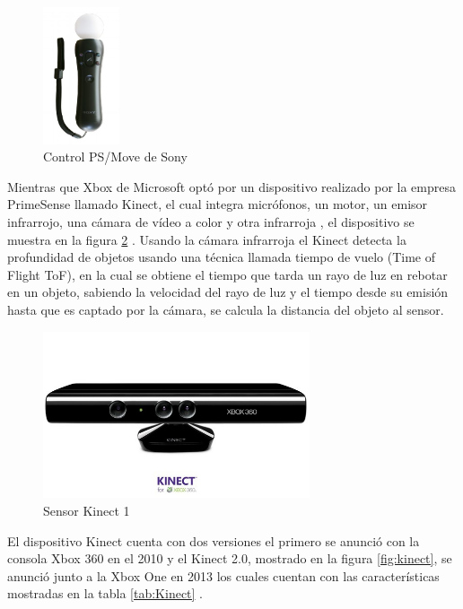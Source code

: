 \begin{figure}[!htb]
	\centering
	\includegraphics[width=0.2\textwidth]{01Introduccion/imagenes/PsMove.JPG}
	\caption{Control PS/Move de Sony} 
	\label{fig:psMove}
\end{figure}

Mientras que Xbox de Microsoft optó por un dispositivo realizado por la empresa PrimeSense llamado Kinect, el cual integra micrófonos, un motor, un emisor infrarrojo, una cámara de vídeo a color y otra infrarroja \cite{UsodelKi56:online}, el dispositivo se muestra en la figura \ref{fig:kinect1} \cite{Microsof29:online}. Usando la cámara infrarroja el Kinect detecta la profundidad de objetos usando una técnica llamada tiempo de vuelo (Time of Flight ToF), en la cual se obtiene el tiempo que tarda un rayo de luz en rebotar en un objeto, sabiendo la velocidad del rayo de luz y el tiempo desde su emisión hasta que es captado por la cámara, se calcula la distancia del objeto al sensor\cite{Lachat2015}.\\

\begin{figure}[!htb]
	\centering
	\includegraphics[width=0.7\textwidth]{01Introduccion/imagenes/xbox360kinect.JPG}
	\caption{Sensor Kinect 1} 
	\label{fig:kinect1}
\end{figure}

El dispositivo Kinect cuenta con dos versiones el primero se anunció con la consola Xbox 360 en el 2010 y el Kinect 2.0, mostrado en la figura \ref{fig:kinect}, se anunció junto a la Xbox One en 2013 los cuales cuentan con las características mostradas en la tabla \ref{tab:Kinect} \cite{UsodelKi56:online}.\\

